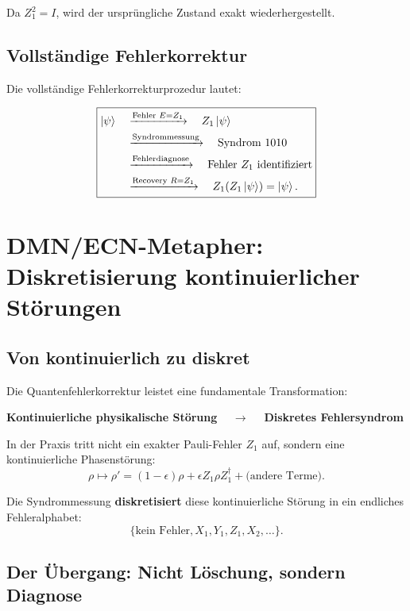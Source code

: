 \documentclass[11pt,a4paper]{article}
\begin{document}
Da $Z_1^2 = I$, wird der ursprüngliche Zustand exakt wiederhergestellt.

\subsection{Vollständige Fehlerkorrektur}

Die vollständige Fehlerkorrekturprozedur lautet:

\begin{equation}
\boxed{
\begin{aligned}
\ket{\psi} \quad &\xrightarrow{\text{Fehler } E = Z_1} \quad Z_1 \ket{\psi} \\
&\xrightarrow{\text{Syndrommessung}} \quad \text{Syndrom } 1010 \\
&\xrightarrow{\text{Fehlerdiagnose}} \quad \text{Fehler } Z_1 \text{ identifiziert} \\
&\xrightarrow{\text{Recovery } R = Z_1} \quad Z_1 (Z_1 \ket{\psi}) = \ket{\psi}.
\end{aligned}
}
\end{equation}

\section{DMN/ECN-Metapher: Diskretisierung kontinuierlicher Störungen}

\subsection{Von kontinuierlich zu diskret}

Die Quantenfehlerkorrektur leistet eine fundamentale Transformation:

\begin{center}
\textbf{Kontinuierliche physikalische Störung} $\quad \longrightarrow \quad$ \textbf{Diskretes Fehlersyndrom}
\end{center}

In der Praxis tritt nicht ein exakter Pauli-Fehler $Z_1$ auf, sondern eine kontinuierliche Phasenstörung:
\[
\rho \mapsto \rho' = (1-\epsilon)\rho + \epsilon Z_1 \rho Z_1^\dagger + \text{(andere Terme)}.
\]

Die Syndrommessung \textbf{diskretisiert} diese kontinuierliche Störung in ein endliches Fehleralphabet:
\[
\{\text{kein Fehler}, X_1, Y_1, Z_1, X_2, \ldots\}.
\]

\subsection{Der Übergang: Nicht Löschung, sondern Diagnose}
\end{document}
